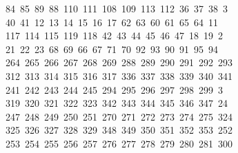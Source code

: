 \begin{tabbing}
\>\ 84\ 85\ 89\ 88\ 110\ 111\ 108\ 109\ 113\ 112\ 36\ 37\ 38\ 3\\[0pt]
\ 40\ 41\ 12\ 13\ 14\ 15\ 16\ 17\ 62\ 63\ 60\ 61\ 65\ 64\ 11\\[0pt]
\ 117\ 114\ 115\ 119\ 118\ 42\ 43\ 44\ 45\ 46\ 47\ 18\ 19\ 2\\[0pt]
\ 21\ 22\ 23\ 68\ 69\ 66\ 67\ 71\ 70\ 92\ 93\ 90\ 91\ 95\ 94\\[0pt]
\>\ 264\ 265\ 266\ 267\ 268\ 269\ 288\ 289\ 290\ 291\ 292\ 293\\[0pt]
\>\ 312\ 313\ 314\ 315\ 316\ 317\ 336\ 337\ 338\ 339\ 340\ 341\ \\[0pt]
\ 241\ 242\ 243\ 244\ 245\ 294\ 295\ 296\ 297\ 298\ 299\ 3\\[0pt]
\ 319\ 320\ 321\ 322\ 323\ 342\ 343\ 344\ 345\ 346\ 347\ 24\\[0pt]
\ 247\ 248\ 249\ 250\ 251\ 270\ 271\ 272\ 273\ 274\ 275\ 324\\[0pt]
\>\ 325\ 326\ 327\ 328\ 329\ 348\ 349\ 350\ 351\ 352\ 353\ 252\\[0pt]
\>\ 253\ 254\ 255\ 256\ 257\ 276\ 277\ 278\ 279\ 280\ 281\ 300\ \\[0pt]

\end{tabbing}
